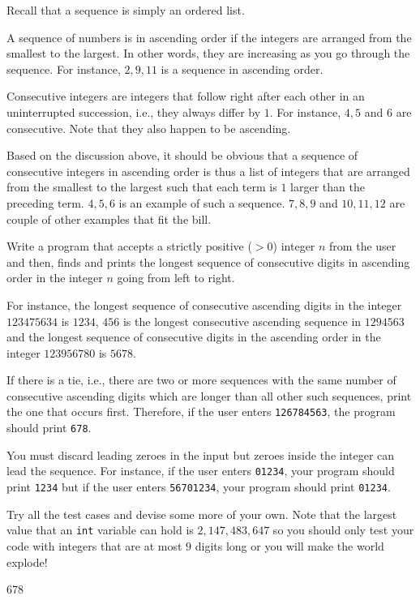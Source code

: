 Recall that a sequence is simply an ordered list.

A sequence of numbers is in ascending order if the integers are arranged from
the smallest to the largest. In other words, they are increasing as you go
through the sequence. For instance, $2, 9, 11$ is a sequence in ascending
order.

Consecutive integers are integers that follow right after each other in an
uninterrupted succession, i.e., they always differ by $1$. For instance, 
$4, 5$ and $6$ are consecutive. Note that they also happen to be ascending.

Based on the discussion above, it should be obvious that a sequence of 
consecutive integers in ascending order is thus a list of integers that are
arranged from the smallest to the largest such that each term is $1$ larger
than the preceding term. $4, 5, 6$ is an example of such a sequence. $7, 8, 9$
and $10, 11, 12$ are couple of other examples that fit the bill.

Write a program that accepts a strictly positive ($>0$) integer $n$ from the
user and then, finds and prints the longest sequence of consecutive digits in
ascending order in the integer $n$ going from left to right.

For instance, the longest sequence of consecutive ascending digits in the
integer $123475634$ is $1234$, $456$ is the longest consecutive ascending
sequence in $1294563$ and the longest sequence of consecutive digits in
the ascending order in the integer $123956780$ is $5678$.

If there is a tie, i.e., there are two or more sequences with the same number
of consecutive ascending digits which are longer than all other such sequences,
print the one that occurs first. Therefore, if the user enters
\verb!126784563!, the program should print \verb!678!.

You must discard leading zeroes in the input but zeroes inside the integer can
lead the sequence. For instance, if the user enters \verb!01234!, your program
should print \verb!1234! but if the user enters \verb!56701234!, your program
should print \verb!01234!.

Try all the test cases and devise some more of your own. Note that the largest
value that an \verb!int! variable can hold is $2,147,483,647$ so you should
only test your code with integers that are at most $9$ digits long or you will
make the world explode!

\resett
\nextt
\begin{console}[commandchars=\\\{\}]
678
\end{console}

